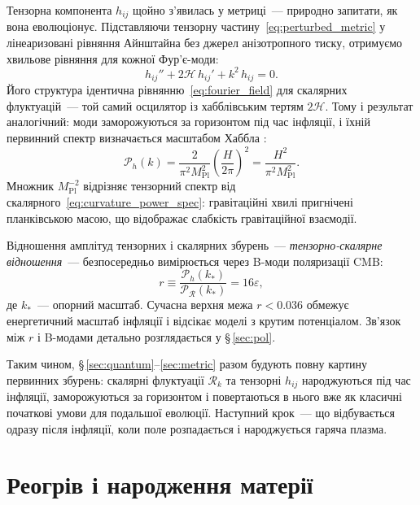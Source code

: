 \documentclass[12pt, a4paper]{article}
\begin{document}
Тензорна компонента $h_{ij}$ щойно з'явилась у метриці~---
природно запитати, як вона еволюціонує. Підставляючи тензорну
частину~\eqref{eq:perturbed_metric} у лінеаризовані рівняння
Айнштайна без джерел анізотропного тиску, отримуємо хвильове
рівняння для кожної Фур'є-моди:
\begin{equation}\label{eq:tensor_wave_eq}
  h_{ij}'' + 2\mathcal{H}\,h_{ij}' + k^2\,h_{ij} = 0.
\end{equation}
Його структура ідентична рівнянню~\eqref{eq:fourier_field}
для скалярних флуктуацій~--- той самий осцилятор із
хабблівським тертям $2\mathcal{H}$. Тому і результат
аналогічний: моди заморожуються за горизонтом під час
інфляції, і їхній первинний спектр визначається масштабом
Хаббла \cite{starobinsky_1979}:
\begin{equation}\label{eq:tensor_power_spec}
  \mathcal{P}_h(k)
    = \frac{2}{\pi^2 M_\mathrm{Pl}^2}
      \left(\frac{H}{2\pi}\right)^{\!2}
    = \frac{H^2}{\pi^2 M_\mathrm{Pl}^2}.
\end{equation}
Множник $M_\mathrm{Pl}^{-2}$ відрізняє тензорний спектр від
скалярного~\eqref{eq:curvature_power_spec}: гравітаційні хвилі
пригнічені планківською масою, що відображає слабкість
гравітаційної взаємодії.

Відношення амплітуд тензорних і скалярних збурень~---
\emph{тензорно-скалярне відношення}~--- безпосередньо
вимірюється через B-моди поляризації CMB:
\begin{equation}\label{eq:tensor_scalar_ratio}
  r \equiv \frac{\mathcal{P}_h(k_*)}
               {\mathcal{P}_{\mathcal{R}}(k_*)}
    = 16\varepsilon,
\end{equation}
де $k_*$~--- опорний масштаб. Сучасна верхня межа
$r < 0.036$ \cite{bicep_keck_2021} обмежує енергетичний
масштаб інфляції і відсікає моделі з крутим потенціалом.
Зв'язок між $r$ і B-модами детально розглядається у
§\,\ref{sec:pol}.

Таким чином, §\,\ref{sec:quantum}–\ref{sec:metric} разом
будують повну картину первинних збурень: скалярні флуктуації
$\mathcal{R}_k$ та тензорні $h_{ij}$ народжуються під час
інфляції, заморожуються за горизонтом і повертаються в нього
вже як класичні початкові умови для подальшої еволюції.
Наступний крок~--- що відбувається одразу після інфляції,
коли поле розпадається і народжується гаряча плазма.


\section{Реогрів і народження матерії}
\label{sec:reheating}
\end{document}
